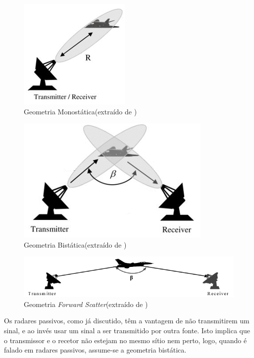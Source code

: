 \begin{figure}[h]
\centering
\includegraphics[scale=0.8]{chapters/ch2/assets/monostatic}
\caption[Geometria Monostática]{Geometria Monostática(extraído de \cite{rcsan})}
\label{fig:monostatic}
\end{figure}

\begin{figure}[h]
\centering
\includegraphics[scale=0.8]{chapters/ch2/assets/bistatic}
\caption[Geometria Bistática]{Geometria Bistática(extraído de \cite{rcsan})}
\label{fig:bistatic}
\end{figure}

\begin{figure}[h]
\centering
\includegraphics[scale=0.7]{chapters/ch2/assets/fsc}
\caption[Geometria \textit{Forward Scatter}]{Geometria \textit{Forward Scatter}(extraído de \cite{rcsan})}
\label{fig:fsc}
\end{figure}

Os radares passivos, como já discutido, têm a vantagem de não transmitirem um sinal, e ao invés usar um sinal a ser transmitido por outra fonte. Isto implica que o transmissor e o recetor não estejam no mesmo sítio nem perto, logo, quando é falado em radares passivos, assume-se a geometria bistática.




